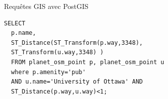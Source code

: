 \begin{frame}[fragile]{Requêtes GIS avec PostGIS}

\begin{verbatim}
SELECT
  p.name,
  ST_Distance(ST_Transform(p.way,3348),
  ST_Transform(u.way,3348) )
  FROM planet_osm_point p, planet_osm_point u
  where p.amenity='pub'
  AND u.name='University of Ottawa' AND
  ST_Distance(p.way,u.way)<1;
\end{verbatim}

\end{frame}




